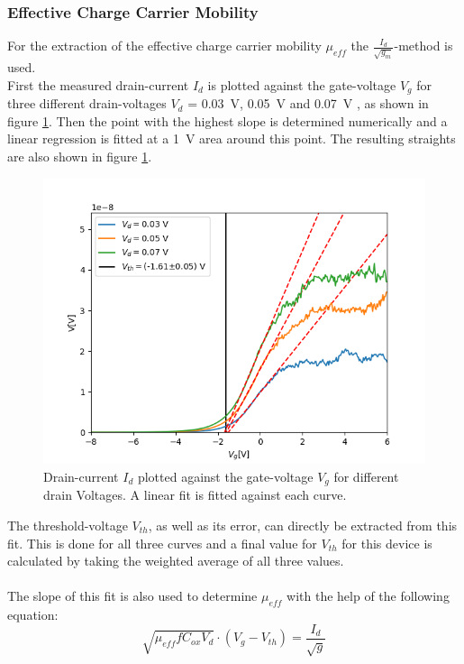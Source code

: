 \documentclass[%
 reprint,
amsmath,amssymb,
pra,
]{revtex4-1}
\begin{document}
\subsubsection{Effective Charge Carrier Mobility}
For the extraction of the effective charge carrier mobility $\mu_{eff}$ the $\frac{I_d}{\sqrt{g_m}}$-method is used.\\
First the measured drain-current $I_d$ is plotted against the gate-voltage $V_g$ for three different drain-voltages $V_d$ = \SI{0.03}{V}, \SI{0.05}{V} and \SI{0.07}{V} , as shown in figure \ref{fig:linreg1}. Then the point with the highest slope is determined numerically and a linear regression is fitted at a \SI{1}{\volt} area around this point. The resulting straights are also shown in figure \ref{fig:linreg1}.
\begin{figure}[h]
\centering
\includegraphics[scale=0.55]{Bilder/linreg.png}
\caption{Drain-current $I_d$ plotted against the gate-voltage $V_g$ for different drain Voltages. A linear fit is fitted against each curve.}
\label{fig:linreg1}
\end{figure}

The threshold-voltage $V_{th}$, as well as its error, can directly be extracted from this fit. This is done for all three curves and a final value for $V_{th}$ for this device is calculated by taking the weighted average of all three values.\\
\\
The slope of this fit is also used to determine $\mu_{eff}$ with the help of the following equation:
\begin{equation}
\sqrt{\mu_{eff} f C_{ox} V_d} \cdot (V_g-V_{th}) = \dfrac{I_d}{\sqrt{g}}
\end{equation}
\end{document}
